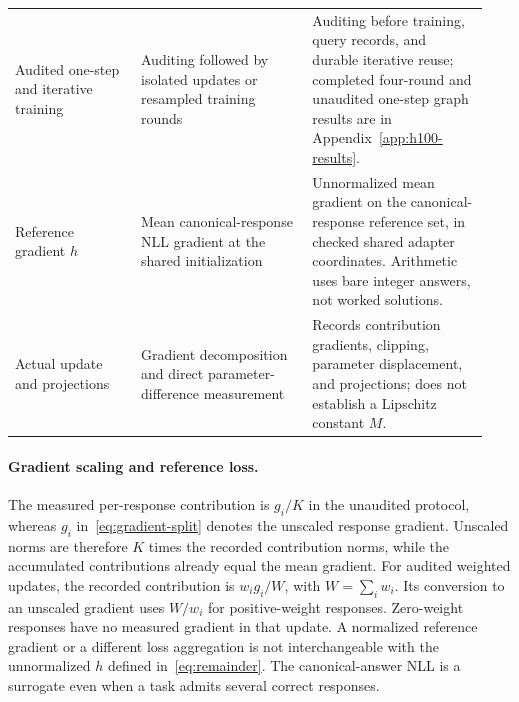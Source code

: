 \begin{table}[H]
\begin{tabular}{@{}p{0.25\linewidth}p{0.34\linewidth}p{0.35\linewidth}@{}}
Audited one-step and iterative training
& Auditing followed by isolated updates or resampled training rounds
& Auditing before training, query records, and durable iterative reuse; completed four-round and unaudited one-step graph results are in Appendix~\ref{app:h100-results}.\\[3pt]
Reference gradient $h$
& Mean canonical-response NLL gradient at the shared initialization
& Unnormalized mean gradient on the canonical-response reference set, in checked shared adapter coordinates. Arithmetic uses bare integer answers, not worked solutions.\\[3pt]
Actual update and projections
& Gradient decomposition and direct parameter-difference measurement
& Records contribution gradients, clipping, parameter displacement, and projections; does not establish a Lipschitz constant $M$.\\
\bottomrule
\end{tabular}
\end{table}

\paragraph{Gradient scaling and reference loss.}
The measured per-response contribution is $g_i/K$ in the unaudited
protocol, whereas $g_i$
in~\eqref{eq:gradient-split} denotes the unscaled response gradient.
Unscaled norms are therefore $K$ times the recorded contribution norms,
while the accumulated contributions already equal the mean gradient.
For audited weighted updates, the recorded contribution is $w_i g_i/W$,
with $W=\sum_iw_i$. Its conversion to an unscaled gradient uses $W/w_i$
for positive-weight responses. Zero-weight responses have no measured gradient
in that update. A normalized reference gradient or a different loss
aggregation is not interchangeable with the unnormalized $h$ defined
in~\eqref{eq:remainder}. The canonical-answer NLL
is a surrogate even when a task admits several correct responses.

